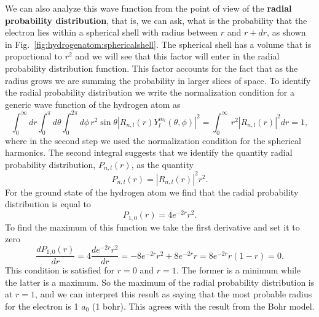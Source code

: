 \documentclass[../Main/chem331-notes.tex]{subfiles}
\begin{document}
We can also analyze this wave function from the point of view of the \textbf{radial probability distribution},
that is, we can ask, what is the probability that the electron lies within a spherical shell with radius between $r$ and $r + dr$, as shown in Fig.~\ref{fig:hydrogenatom:sphericalshell}.
The spherical shell has a volume that is proportional to $r^2$ and we will see that this factor will enter in the radial probability distribution function. This factor accounts for the fact that as the radius grows we are summing the probability in larger slices of space.
To identify the radial probability distribution we write the normalization condition for a generic wave function of the hydrogen atom as
\begin{equation}
\int_{0}^{\infty} dr
\int_{0}^{\pi} d\theta
\int_{0}^{2\pi} d\phi \,r^2 \sin \theta |R_{n,l}(r) Y_l^{m_l}(\theta,\phi)|^2
= \int_{0}^{\infty} \,r^2 |R_{n,l}(r)|^2 dr = 1,
\end{equation}
where in the second step we used the normalization condition for the spherical harmonics.
The second integral suggests that we identify the quantity radial probability distribution, $P_{n,l}(r)$, as the quantity
\begin{equation}
P_{n,l}(r) = |R_{n,l}(r)|^2 r^2.
\end{equation}
For the ground state of the hydrogen atom we find that the radial probability distribution is equal to
\begin{equation}
P_{1,0}(r) =4 e^{-2r} r^2.
\end{equation}
To find the maximum of this function we take the first derivative and set it to zero
\begin{equation}
\frac{d P_{1,0}(r)}{dr} =4 \frac{d e^{-2r} r^2}{dr} = -8 e^{-2r} r^2 + 8 e^{-2r} r = 8 e^{-2r} r (1 - r) = 0.
\end{equation}
This condition is satisfied for $r = 0$ and $r = 1$. The former is a minimum while the latter is a maximum.
So the maximum of the radial probability distribution is at $r=1$, and we can interpret this result as saying that  the most probable radius for the electron is 1 $a_0$ (1 bohr). This agrees with the result from the Bohr model.
\end{document}
